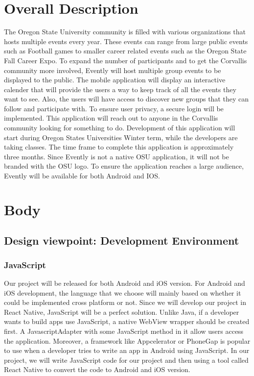 \documentclass[letterpaper, 10pt,titlepage]{article}
\begin{document}
\section{Overall Description}
The Oregon State University community is filled with various organizations that hosts multiple events every year. These events can range from large public events such as Football games to smaller career related events such as the Oregon State Fall Career Expo. To expand the number of participants and to get the Corvallis community more involved, Evently will host multiple group events to be displayed to the public. The mobile application will display an interactive calender that will provide the users a way to keep track of all the events they want to see. Also, the users will have access to discover new groups that they can follow and participate with. To ensure user privacy, a secure login will be implemented. This application will reach out to anyone in the Corvallis community looking for something to do. Development of this application will start during Oregon States Universities Winter term, while the developers are taking classes. The time frame to complete this application is approximately three months. Since Evently is not a native OSU application, it will not be branded with the OSU logo. To ensure the application reaches a large audience, Evently will be available for both Android and IOS.

\section{Body}
\subsection{Design viewpoint: Development Environment}
\subsubsection{JavaScript}
Our project will be released for both Android and iOS version. For Android and iOS development, the language that we choose will mainly based on whether it could be implemented cross platform or not. Since we will develop our project in React Native, JavaScript will be a perfect solution. Unlike Java, if a developer wants to build apps use JavaScript, a native WebView wrapper should be created first. A JavascriptAdapter with some JavaScript method in it allow users access the application. Moreover, a framework like Appcelerator or PhoneGap is popular to use when a developer tries to write an app in Android using JavaScript. In our project, we will write JavaScript code for our project and then using a tool called React Native to convert the code to Android and iOS version. 
\end{document}
